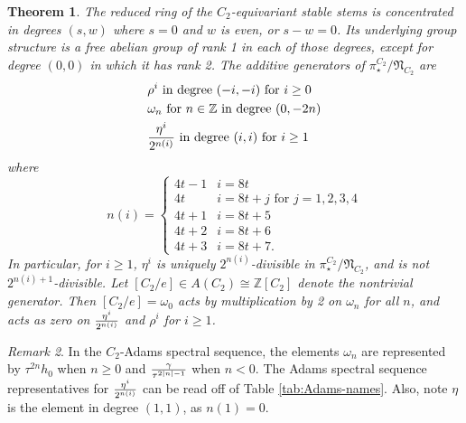 \documentclass[psamsfonts]{amsart}
\newcommand{\Z}{\mathbb Z}
\newcommand{\fN}{\mathfrak N}
\newtheorem{theorem}{Theorem}[section]
\theoremstyle{definition}
\theoremstyle{remark}
\newtheorem{remark}[theorem]{Remark}
\newcommand{\EvaNote}[1]
   {\marginpar{\raggedright\smaller \smaller \color{Periwinkle}#1}}
\numberwithin{equation}{section}
\begin{document}
\begin{theorem}\label{thm:n(i)}
The reduced ring of the $C_2$-equivariant stable stems is concentrated in degrees $(s,w)$ where $s=0$ and $w$ is even, or $s-w=0$. Its underlying group structure is a free abelian group of rank 1 in each of those degrees, except for degree $(0,0)$ in which it has rank 2. The additive generators of $\pi_\star^{C_2}/\fN_{C_2}$ are
\begin{align*}
&\rho^i\text{ in degree $(-i,-i)$ for $i\geq 0$}
\\&\omega_n\text{ for $n\in \Z$ in degree $(0,-2n)$}
\\&{\eta^i\over 2^{n(i)}} \text{ in degree  $(i,i)$ for $i\geq 1$}
\end{align*}
where
$$ n(i) = \begin{cases} 
4t-1 & i = 8t
\\4t & i = 8t+j \text{ for } j = 1,2,3,4
\\4t+1 & i = 8t+5
\\4t+2 & i = 8t+6
\\4t+3 & i = 8t+7.
\end{cases} $$
In particular, for $i\geq 1$, $\eta^i$ is uniquely $2^{n(i)}$-divisible in
$\pi_\star^{C_2}/\fN_{C_2}$, and is not $2^{n(i)+1}$-divisible. Let $[C_2/e] \in A(C_2)\cong \Z[C_2]$ denote the nontrivial
generator. Then $[C_2/e]= \omega_0$ acts by multiplication by 2 on $\omega_n$
for all $n$,
and acts as zero on ${\eta^i\over 2^{n(i)}}$ and $\rho^i$ for $i\geq 1$.
\end{theorem}

\begin{remark}
In the $C_2$-Adams spectral sequence, the elements $\omega_n$ are represented by $\tau^{2n}h_0$ when $n\geq 0$ and
${\gamma\over \tau^{2|n|-1}}$ when $n < 0$.
The Adams spectral sequence representatives for ${\eta^i\over 2^{n(i)}}$ can be
read off of Table \ref{tab:Adams-names}.
Also, note $\eta$ is the element in degree $(1,1)$, as $n(1)=0$.
\end{remark}
\end{document}

